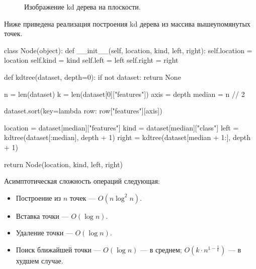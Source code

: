 \begin{figure}[htb]
  \centering
  \caption{Изображение kd дерева на плоскости.}
  \label{ml:knn:kdtree-2d}
\end{figure}

Ниже приведена реализация построения kd дерева из массива вышеупомянутых точек.

\begin{pylst}{}{}
class Node(object):
    def __init__(self, location, kind, left, right):
        self.location = location
        self.kind = kind
        self.left = left
        self.right = right

def kdtree(dataset, depth=0):
    if not dataset:
        return None

    n = len(dataset)
    k = len(dataset[0]["features"])
    axis = depth %
    median = n // 2

    dataset.sort(key=lambda row: row["features"][axis])

    location = dataset[median]["features"]
    kind = dataset[median]["class"]
    left = kdtree(dataset[:median], depth + 1)
    right = kdtree(dataset[median + 1:], depth + 1)

    return Node(location, kind, left, right)
\end{pylst}

Асимптотическая сложность операций следующая:
\begin{itemize}
  \item Построение из $n$ точек — $O(n \log^2 n)$.
  \item Вставка точки — $O(\log n)$.
  \item Удаление точки — $O(\log n)$.
  \item Поиск ближайшей точки — $O(\log n)$ — в среднем; $O(k \cdot n^{1 - \frac{1}{k}})$ — в худшем случае.
\end{itemize}
